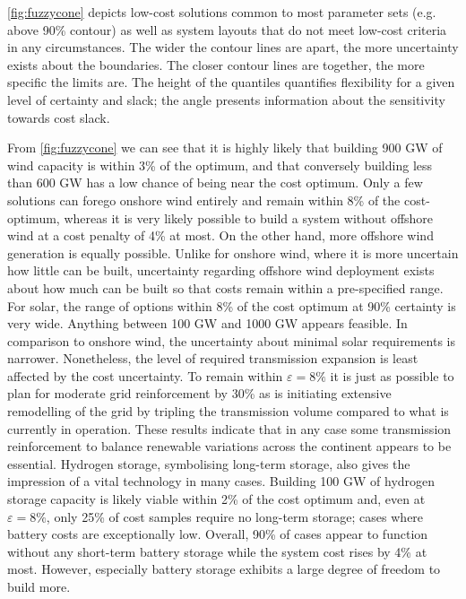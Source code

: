 \cref{fig:fuzzycone} depicts low-cost solutions common to most parameter sets (e.g. above 90\% contour)
as well as system layouts that do not meet low-cost criteria in any circumstances.
The wider the contour lines are apart, the more uncertainty exists about the boundaries.
The closer contour lines are together, the more specific the limits are.
The height of the quantiles quantifies flexibility for a given level of certainty and slack;
the angle presents information about the sensitivity towards cost slack.

From \cref{fig:fuzzycone} we can see that it is 
highly likely that building 900 GW of wind capacity is within 3\% of the optimum, and that
conversely building less than 600 GW has a low chance of being near the cost optimum.
Only a few solutions can forego onshore wind entirely and remain within 8\% of the cost-optimum,
whereas it is very likely possible to build a system without offshore wind at a cost penalty of 4\% at most.
On the other hand, more offshore wind generation is equally possible.
Unlike for onshore wind, where it is more uncertain how little can be built,
uncertainty regarding offshore wind deployment exists about how much can be built
so that costs remain within a pre-specified range.
For solar, the range of options within 8\% of the cost optimum at 90\% certainty is very wide.
Anything between 100 GW and 1000 GW appears feasible.
In comparison to onshore wind, the uncertainty about minimal solar requirements is narrower.
Nonetheless, the level of required transmission expansion is least affected by the cost uncertainty.
To remain within $\varepsilon=8\%$ it is just as possible to
plan for moderate grid reinforcement by 30\% as 
is initiating extensive remodelling of the grid by tripling the transmission volume
compared to what is currently in operation.
These results indicate that in any case some transmission reinforcement
to balance renewable variations across the continent appears to be essential.
Hydrogen storage, symbolising long-term storage, also gives the impression of a vital technology in many cases.
Building 100 GW of hydrogen storage capacity is likely viable within 2\% of the cost optimum 
and, even at $\varepsilon=8\%$, only 25\% of cost samples require no long-term storage; 
cases where battery costs are exceptionally low.
Overall, 90\% of cases appear to function without any short-term battery storage
while the system cost rises by 4\% at most.
However, especially battery storage exhibits a large degree of freedom to build more.

